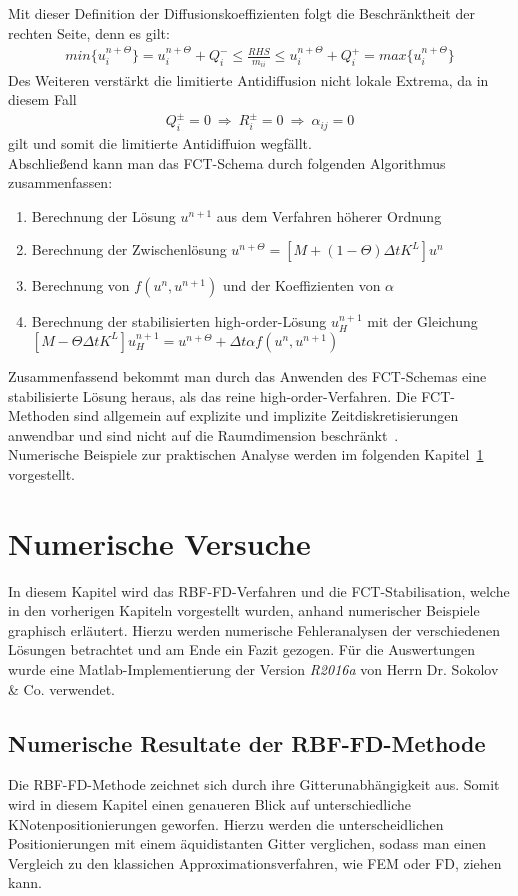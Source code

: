 \documentclass[12pt,titlepage]{article}
\begin{document}
Mit dieser Definition der Diffusionskoeffizienten folgt die Beschränktheit der rechten Seite, denn es gilt:
\begin{align}
 min\{u_i^{n+\Theta}\}=u_i^{n+\Theta}+Q_i^-\le\frac{RHS}{m_{ii}}\le u_i^{n+\Theta}+Q_i^+=max\{u_i^{n+\Theta}\}\nonumber
\end{align}
Des Weiteren verstärkt die limitierte Antidiffusion nicht lokale Extrema, da in diesem Fall
\begin{align}
 Q_i^\pm=0~\Rightarrow~ R_i^\pm=0~\Rightarrow~\alpha_{ij}=0\nonumber
\end{align}
gilt und somit die limitierte Antidiffuion wegfällt.\\
Abschließend kann man das FCT-Schema durch folgenden Algorithmus zusammenfassen:
\begin{enumerate}
 \item Berechnung der Lösung $u^{n+1}$ aus dem Verfahren höherer Ordnung
 \item Berechnung der Zwischenlösung $u^{n+\Theta}=[M+(1-\Theta)\Delta tK^L]u^n$
 \item Berechnung von $f(u^n,u^{n+1})$ und der Koeffizienten von $\alpha$
 \item Berechnung der stabilisierten high-order-Lösung $u_H^{n+1}$ mit der Gleichung $[M-\Theta\Delta tK^L]u_H^{n+1}=u^{n+\Theta}+\Delta t\alpha f(u^n,u^{n+1})$
\end{enumerate}
Zusammenfassend bekommt man durch das Anwenden des FCT-Schemas eine stabilisierte Lösung heraus, als das reine high-order-Verfahren. Die FCT-Methoden sind allgemein auf explizite und implizite Zeitdiskretisierungen anwendbar und sind nicht auf die Raumdimension beschränkt~\cite{kuzmin2002flux}.\\ Numerische Beispiele zur praktischen Analyse werden im folgenden Kapitel~\ref{sec:NumVers} vorgestellt. 
\pagebreak
\section{Numerische Versuche}\label{sec:NumVers}
In diesem Kapitel wird das RBF-FD-Verfahren und die FCT-Stabilisation, welche in den vorherigen Kapiteln vorgestellt wurden, anhand numerischer Beispiele graphisch erläutert. Hierzu werden numerische Fehleranalysen der verschiedenen Lösungen betrachtet und am Ende ein Fazit gezogen. Für die Auswertungen wurde eine Matlab-Implementierung der Version \textit{R2016a} von Herrn Dr. Sokolov \& Co. verwendet.
\subsection{Numerische Resultate der RBF-FD-Methode}
Die RBF-FD-Methode zeichnet sich durch ihre Gitterunabhängigkeit aus. Somit wird in diesem Kapitel einen genaueren Blick auf unterschiedliche KNotenpositionierungen geworfen. Hierzu werden die unterscheidlichen Positionierungen mit einem äquidistanten Gitter verglichen, sodass man einen Vergleich zu den klassichen Approximationsverfahren, wie FEM oder FD, ziehen kann.
\end{document}
